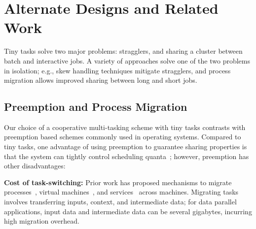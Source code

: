 \section{Alternate Designs and Related Work}
\label{sec:alternate}

Tiny tasks solve two major problems: stragglers, and sharing
a cluster between batch and interactive jobs. A variety of
approaches solve one of the two problems in isolation; e.g., skew handling
techniques mitigate stragglers, and process migration allows improved
sharing between long and short jobs.

\subsection{Preemption and Process Migration}
\label{sec:preemption}

Our choice of a cooperative multi-tasking scheme with tiny tasks
contrasts with preemption based schemes commonly used
in operating systems.
Compared to tiny tasks, one advantage of using preemption to guarantee sharing
properties is that the system
can tightly control scheduling quanta~\cite{sherman1972trace,tanenbaum1990experiences};
however, preemption has other disadvantages:

\vspace{4pt}\noindent\textbf{Cost of task-switching:}
Prior work has proposed mechanisms to migrate
processes~\cite{douglis1991transparent,milojivcic2000process}, virtual
machines~\cite{clark2005live}, and services~\cite{rozier1991overview} across
machines.
Migrating tasks involves transferring inputs, context, and intermediate
data; for data parallel applications, input data and intermediate
data can be several gigabytes, incurring high migration overhead.

